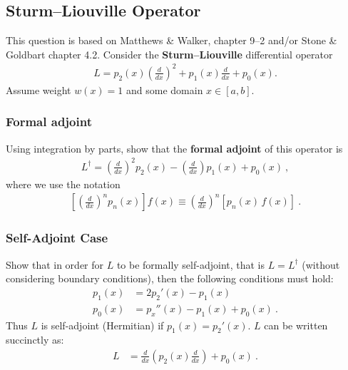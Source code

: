 \documentclass[12pt]{article}
\numberwithin{equation}{subsection}    %
\begin{document}
\subsection{Sturm--Liouville Operator}

This question is based on Matthews \& Walker, chapter 9--2 and/or Stone \& Goldbart chapter 4.2. Consider the \textbf{Sturm--Liouville} differential operator
\begin{align}
	L = p_2(x) \left(\frac{d}{dx}\right)^2
	+ p_1(x)\frac{d}{dx}
	+ p_0(x) .
\end{align}
Assume weight $w(x) = 1$ and some domain $x\in [a,b]$.


\subsubsection{Formal adjoint}
Using integration by parts, show that the \textbf{formal adjoint} of this operator is 
\begin{align}
	L^\dag = \left(\frac{d}{dx}\right)^2 p_2(x)
	- \left(\frac{d}{dx}\right)p_1(x)
	+ p_0(x) \ ,
\end{align}
where we use the notation 
\begin{align}
	\left[\left(\frac{d}{dx}\right)^n p_n(x)\right] f(x) \equiv 
		\left(\frac{d}{dx}\right)^n 
		\left[ p_n(x)\, f(x)\right] \ .
\end{align}

\subsubsection{Self-Adjoint Case}

Show that in order for $L$ to be formally self-adjoint, that is $L = L^\dag$ (without considering boundary conditions), then the following conditions must hold:
\begin{align}
	p_1(x) &= 2p_2'(x) - p_1(x) \\
	p_0(x) &= p_x''(x) - p_1(x) + p_0(x) \ .
\end{align}
Thus $L$ is self-adjoint (Hermitian) if $p_1(x) = p_2'(x)$. $L$ can be written succinctly as:
\begin{align}
	L &= \frac{d}{dx}
		\left(p_2(x)\frac{d}{dx}\right) + p_0(x) \ .
\end{align}
\end{document}

